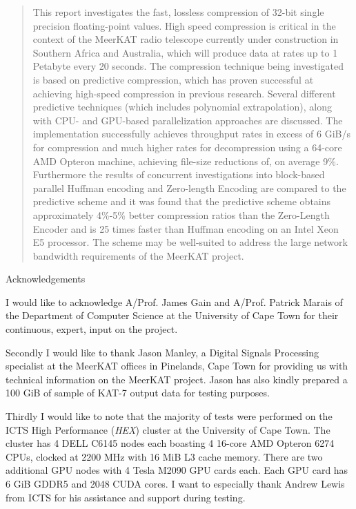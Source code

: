 \pagebreak
\begin{abstract}
 This report investigates the fast, lossless compression of 32-bit single precision floating-point values. High speed compression is critical in the context of the MeerKAT 
 radio telescope currently under construction in Southern Africa and Australia, which will produce data at rates up to 1 Petabyte every 20 seconds. The compression technique being 
 investigated is based on predictive compression, which has proven successful at achieving high-speed compression in previous research. Several different predictive 
 techniques (which includes polynomial extrapolation), along with CPU- and GPU-based parallelization approaches are discussed. The implementation successfully achieves throughput rates 
 in excess of 6 GiB/s for compression and much higher rates for decompression using a 64-core AMD Opteron machine, achieving file-size reductions of, on average 9\%. Furthermore
 the results of concurrent investigations into block-based parallel Huffman encoding and Zero-length Encoding are compared to the predictive scheme and it was found that
 the predictive scheme obtains approximately 4\%-5\% better compression ratios than the Zero-Length Encoder and is 25 times faster than Huffman encoding on an Intel Xeon E5 processor. The
 scheme may be well-suited to address the large network bandwidth requirements of the MeerKAT project.
\end{abstract}

\pagebreak
\begin{center} 
  {\LARGE Acknowledgements}
\end{center}
\vspace{50pt}

I would like to acknowledge A/Prof. James Gain and A/Prof. Patrick Marais of the Department of Computer Science at the University of Cape Town for their continuous, expert, input on the project.

Secondly I would like to thank Jason Manley, a Digital Signals Processing specialist at the MeerKAT offices in Pinelands, Cape Town for providing us with technical information
on the MeerKAT project. Jason has also kindly prepared a 100 GiB of sample of KAT-7 output data for testing purposes.

Thirdly I would like to note that the majority of tests were performed on the ICTS High Performance (\textit{HEX}) cluster at the University of Cape Town. The cluster has 4 DELL C6145 nodes each boasting 4 16-core
AMD Opteron 6274 CPUs, clocked at 2200 MHz with 16 MiB L3 cache memory. There are two additional GPU nodes with 4 Tesla M2090 GPU cards each. Each GPU card has 6 GiB GDDR5 and 2048 CUDA cores. I want to 
especially thank Andrew Lewis from ICTS for his assistance and support during testing.

